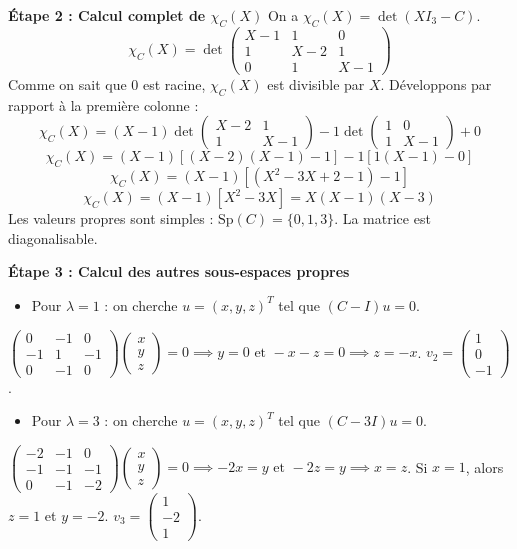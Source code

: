 \documentclass[11pt,a4paper]{article}
\begin{document}
\textbf{Étape 2 : Calcul complet de $\chi_C(X)$}
On a $\chi_C(X) = \det(X I_3 - C)$.
$$\chi_C(X) = \det\begin{pmatrix} X-1 & 1 & 0 \\ 1 & X-2 & 1 \\ 0 & 1 & X-1 \end{pmatrix}$$
Comme on sait que $0$ est racine, $\chi_C(X)$ est divisible par $X$. Développons par rapport à la première colonne :
$$\chi_C(X) = (X-1) \det\begin{pmatrix} X-2 & 1 \\ 1 & X-1 \end{pmatrix} - 1 \det\begin{pmatrix} 1 & 0 \\ 1 & X-1 \end{pmatrix} + 0$$
$$\chi_C(X) = (X-1) [ (X-2)(X-1) - 1 ] - 1 [ 1(X-1) - 0 ]$$
$$\chi_C(X) = (X-1)[(X^2 - 3X + 2 - 1) - 1]$$
$$\chi_C(X) = (X-1)[X^2 - 3X] = X(X-1)(X-3)$$
Les valeurs propres sont simples : $\text{Sp}(C) = \{0, 1, 3\}$. La matrice est diagonalisable.

\textbf{Étape 3 : Calcul des autres sous-espaces propres}
\begin{itemize}
\item Pour $\lambda = 1$ : on cherche $u = (x,y,z)^T$ tel que $(C-I)u = 0$.
\end{itemize}
$\begin{pmatrix} 0 & -1 & 0 \\ -1 & 1 & -1 \\ 0 & -1 & 0 \end{pmatrix} \begin{pmatrix} x \\ y \\ z \end{pmatrix} = 0 \implies y = 0 \text{ et } -x - z = 0 \implies z = -x$.
$v_2 = \begin{pmatrix} 1 \\ 0 \\ -1 \end{pmatrix}$.

\begin{itemize}
\item Pour $\lambda = 3$ : on cherche $u = (x,y,z)^T$ tel que $(C-3I)u = 0$.
\end{itemize}
$\begin{pmatrix} -2 & -1 & 0 \\ -1 & -1 & -1 \\ 0 & -1 & -2 \end{pmatrix} \begin{pmatrix} x \\ y \\ z \end{pmatrix} = 0 \implies -2x = y \text{ et } -2z = y \implies x = z$.
Si $x=1$, alors $z=1$ et $y=-2$.
$v_3 = \begin{pmatrix} 1 \\ -2 \\ 1 \end{pmatrix}$.
\end{document}
